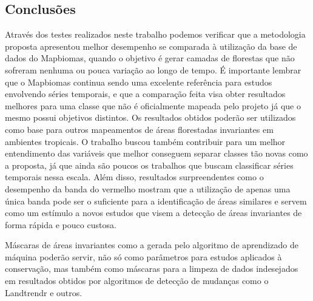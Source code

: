 \subsection{Conclusões}

\hspace{13pt} Através dos testes realizados neste trabalho podemos verificar que a metodologia proposta apresentou melhor desempenho se comparada à utilização da base de dados do Mapbiomas, quando o objetivo é gerar camadas de florestas que não sofreram nenhuma ou pouca variação ao longo de tempo. É importante lembrar que o Mapbiomas continua sendo uma excelente referência para estudos envolvendo séries temporais, e que a comparação feita visa obter resultados melhores para uma classe que não é oficialmente mapeada pelo projeto já que o mesmo possui objetivos distintos. Os resultados obtidos poderão ser utilizados como base para outros mapeamentos de áreas florestadas invariantes em ambientes tropicais. O trabalho buscou também contribuir para um melhor entendimento das variáveis que melhor conseguem separar classes tão novas como a proposta, já que ainda são poucos os trabalhos que buscam classificar séries temporais nessa escala. Além disso, resultados surpreendentes como o desempenho da banda do vermelho mostram que a utilização de apenas uma única banda pode ser o suficiente para a identificação de áreas similares e servem como um estímulo a novos estudos que visem a detecção de áreas invariantes de forma rápida e pouco custosa.

Máscaras de áreas invariantes como a gerada pelo algoritmo de aprendizado de máquina poderão servir, não só como parâmetros para estudos aplicados à conservação, mas também como máscaras para a limpeza de dados indesejados em resultados obtidos por algoritmos de detecção de mudanças como o Landtrendr e outros.